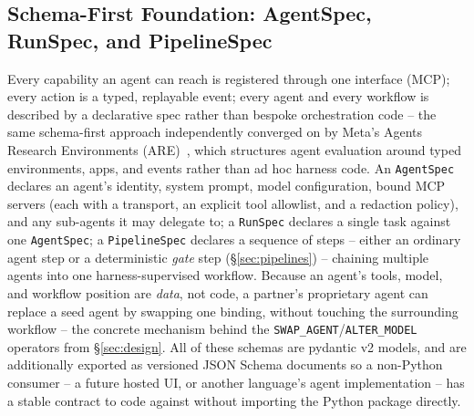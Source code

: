 \documentclass[10pt,conference]{IEEEtran}
\begin{document}
\subsection{Schema-First Foundation: AgentSpec, RunSpec, and PipelineSpec}
Every capability an agent can reach is registered through one interface
(MCP); every action is a typed, replayable event; every agent and every
workflow is described by a declarative spec rather than bespoke
orchestration code -- the same schema-first approach independently converged
on by Meta's Agents Research Environments
(ARE)~\cite{froger2025arescalingagentenvironments}, which structures agent
evaluation around typed environments, apps, and events rather than ad hoc
harness code. An \texttt{AgentSpec} declares an agent's identity, system
prompt, model configuration, bound MCP servers (each with a transport, an
explicit tool allowlist, and a redaction policy), and any sub-agents it may
delegate to; a \texttt{RunSpec} declares a single task against one
\texttt{AgentSpec}; a \texttt{PipelineSpec} declares a sequence of steps --
either an ordinary agent step or a deterministic \emph{gate} step
(\S\ref{sec:pipelines}) -- chaining multiple agents into one
harness-supervised workflow. Because an agent's tools, model, and workflow
position are \emph{data}, not code, a partner's proprietary agent can
replace a seed agent by swapping one binding, without touching the
surrounding workflow -- the concrete mechanism behind the
\texttt{SWAP\_AGENT}/\texttt{ALTER\_MODEL} operators from \S\ref{sec:design}.
All of these schemas are pydantic v2 models, and are additionally exported
as versioned JSON Schema documents so a non-Python consumer -- a future
hosted UI, or another language's agent implementation -- has a stable
contract to code against without importing the Python package directly.
\end{document}
